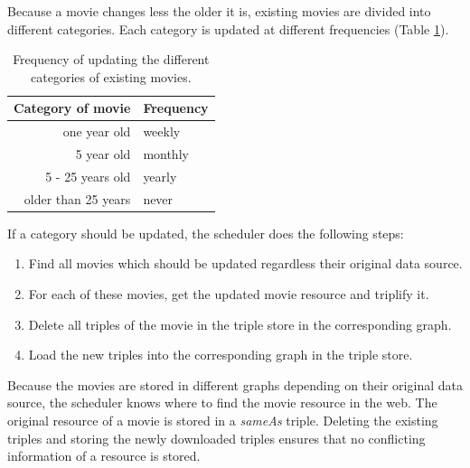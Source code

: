 Because a movie changes less the older it is, existing movies are divided into different categories.
Each category is updated at different frequencies (Table \ref{tab_updating_existing}).
\begin{table}[ht]
	\begin{center}
	\begin{tabular}{rl}
		\textbf{Category of movie} & \textbf{Frequency} \\ \hline
		one year old & weekly \\
		5 year old & monthly \\
		5 - 25 years old & yearly \\
		older than 25 years & never \\
	\end{tabular}
	\end{center}
	\caption{Frequency of updating the different categories of existing movies.}
	\label{tab_updating_existing}
\end{table}
If a category should be updated, the scheduler does the following steps:
\begin{enumerate}
	\item Find all movies which should be updated regardless their original data source.
	\item For each of these movies, get the updated movie resource and triplify it.
	\item Delete all triples of the movie in the triple store in the corresponding graph.
	\item Load the new triples into the corresponding graph in the triple store.
\end{enumerate}
Because the movies are stored in different graphs depending on their original data source, the scheduler knows where to find the movie resource in the web.
The original resource of a movie is stored in a \emph{sameAs} triple.
Deleting the existing triples and storing the newly downloaded triples ensures that no conflicting information of a resource is stored.